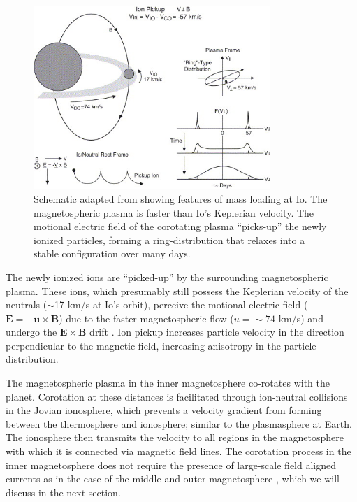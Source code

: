 \begin{figure}
    \centering
    \includegraphics[width=0.8\textwidth]{images1/chp1-io-massloading.jpg}
    \caption{Schematic adapted from \protect{} showing features of mass loading at Io. The magnetospheric plasma is faster than Io's Keplerian velocity. The motional electric field of the corotating plasma ``picks-up'' the newly ionized particles, forming a ring-distribution that relaxes into a stable configuration over many days.}
    \label{fig:io-torus-schematic}
\end{figure}

The newly ionized ions are ``picked-up'' by the surrounding magnetospheric plasma. These ions, which presumably still possess the Keplerian velocity of the neutrals ($\sim$17 km/s at Io's orbit), perceive the motional electric field ($\mathbf{E} = -\mathbf{u} \times \mathbf{B}$) due to the faster magnetospheric flow ($u=\sim74$ km/s) and undergo the $\mathbf{E} \times \mathbf{B}$ drift \cite{Russell2005InteractionEnvironments}. Ion pickup increases particle velocity in the direction perpendicular to the magnetic field, increasing anisotropy in the particle distribution. 

The magnetospheric plasma in the inner magnetosphere co-rotates with the planet. Corotation at these distances is facilitated through ion-neutral collisions in the Jovian ionosphere, which prevents a velocity gradient from forming between the thermosphere and ionosphere; similar to the plasmasphere at Earth. The ionosphere then transmits the velocity to all regions in the magnetosphere with which it is connected via magnetic field lines. The corotation process in the inner magnetosphere does not require the presence of large-scale field aligned currents as in the case of the middle and outer magnetosphere \cite{Vasyliunas1983a}, which we will discuss in the next section.

